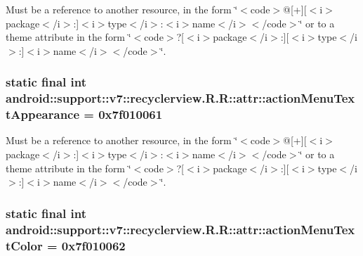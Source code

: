 Must be a reference to another resource, in the form \char`\"{}$<$code$>$@\mbox{[}+\mbox{]}\mbox{[}$<$i$>$package$<$/i$>$:\mbox{]}$<$i$>$type$<$/i$>$:$<$i$>$name$<$/i$>$$<$/code$>$\char`\"{} or to a theme attribute in the form \char`\"{}$<$code$>$?\mbox{[}$<$i$>$package$<$/i$>$:\mbox{]}\mbox{[}$<$i$>$type$<$/i$>$:\mbox{]}$<$i$>$name$<$/i$>$$<$/code$>$\char`\"{}. \hypertarget{classandroid_1_1support_1_1v7_1_1recyclerview_1_1_r_1_1attr_6b27380609ab5e49d1c68a8ed07b61eb}{
\subsubsection[{actionMenuTextAppearance}]{\setlength{\rightskip}{0pt plus 5cm}static final int android::support::v7::recyclerview.R.R::attr::actionMenuTextAppearance = 0x7f010061}}
\label{classandroid_1_1support_1_1v7_1_1recyclerview_1_1_r_1_1attr_6b27380609ab5e49d1c68a8ed07b61eb}


Must be a reference to another resource, in the form \char`\"{}$<$code$>$@\mbox{[}+\mbox{]}\mbox{[}$<$i$>$package$<$/i$>$:\mbox{]}$<$i$>$type$<$/i$>$:$<$i$>$name$<$/i$>$$<$/code$>$\char`\"{} or to a theme attribute in the form \char`\"{}$<$code$>$?\mbox{[}$<$i$>$package$<$/i$>$:\mbox{]}\mbox{[}$<$i$>$type$<$/i$>$:\mbox{]}$<$i$>$name$<$/i$>$$<$/code$>$\char`\"{}. \hypertarget{classandroid_1_1support_1_1v7_1_1recyclerview_1_1_r_1_1attr_4c2fad49f8b922c79201ed3025ea76c7}{
\subsubsection[{actionMenuTextColor}]{\setlength{\rightskip}{0pt plus 5cm}static final int android::support::v7::recyclerview.R.R::attr::actionMenuTextColor = 0x7f010062}}
\label{classandroid_1_1support_1_1v7_1_1recyclerview_1_1_r_1_1attr_4c2fad49f8b922c79201ed3025ea76c7}


